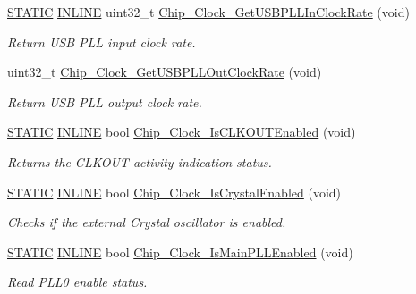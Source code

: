 \begin{DoxyCompactItemize}
\hyperlink{group__LPC__Types__Public__Macros_ga10b2d890d871e1489bb02b7e70d9bdfb}{S\+T\+A\+T\+IC} \hyperlink{group__LPC__Types__Public__Types_ga2eb6f9e0395b47b8d5e3eeae4fe0c116}{I\+N\+L\+I\+NE} uint32\+\_\+t \hyperlink{group__CLOCK__17XX__40XX_gaa97e3b970f577ea06e5d4f76097576c7}{Chip\+\_\+\+Clock\+\_\+\+Get\+U\+S\+B\+P\+L\+L\+In\+Clock\+Rate} (void)
\begin{DoxyCompactList}\small\item\em Return U\+SB P\+LL input clock rate. \end{DoxyCompactList}\item 
uint32\+\_\+t \hyperlink{group__CLOCK__17XX__40XX_ga89cab6cddba486f9c820b06e0a28bade}{Chip\+\_\+\+Clock\+\_\+\+Get\+U\+S\+B\+P\+L\+L\+Out\+Clock\+Rate} (void)
\begin{DoxyCompactList}\small\item\em Return U\+SB P\+LL output clock rate. \end{DoxyCompactList}\item 
\hyperlink{group__LPC__Types__Public__Macros_ga10b2d890d871e1489bb02b7e70d9bdfb}{S\+T\+A\+T\+IC} \hyperlink{group__LPC__Types__Public__Types_ga2eb6f9e0395b47b8d5e3eeae4fe0c116}{I\+N\+L\+I\+NE} bool \hyperlink{group__CLOCK__17XX__40XX_ga01120c20f4485599176f9b46a34b70fe}{Chip\+\_\+\+Clock\+\_\+\+Is\+C\+L\+K\+O\+U\+T\+Enabled} (void)
\begin{DoxyCompactList}\small\item\em Returns the C\+L\+K\+O\+UT activity indication status. \end{DoxyCompactList}\item 
\hyperlink{group__LPC__Types__Public__Macros_ga10b2d890d871e1489bb02b7e70d9bdfb}{S\+T\+A\+T\+IC} \hyperlink{group__LPC__Types__Public__Types_ga2eb6f9e0395b47b8d5e3eeae4fe0c116}{I\+N\+L\+I\+NE} bool \hyperlink{group__CLOCK__17XX__40XX_gaa6cb29b84e27240e44c6ab89775bac97}{Chip\+\_\+\+Clock\+\_\+\+Is\+Crystal\+Enabled} (void)
\begin{DoxyCompactList}\small\item\em Checks if the external Crystal oscillator is enabled. \end{DoxyCompactList}\item 
\hyperlink{group__LPC__Types__Public__Macros_ga10b2d890d871e1489bb02b7e70d9bdfb}{S\+T\+A\+T\+IC} \hyperlink{group__LPC__Types__Public__Types_ga2eb6f9e0395b47b8d5e3eeae4fe0c116}{I\+N\+L\+I\+NE} bool \hyperlink{group__CLOCK__17XX__40XX_ga63e9e5918d1a8b0d1c5811c3f0189846}{Chip\+\_\+\+Clock\+\_\+\+Is\+Main\+P\+L\+L\+Enabled} (void)
\begin{DoxyCompactList}\small\item\em Read P\+L\+L0 enable status. \end{DoxyCompactList}\item 

\end{DoxyCompactItemize}
